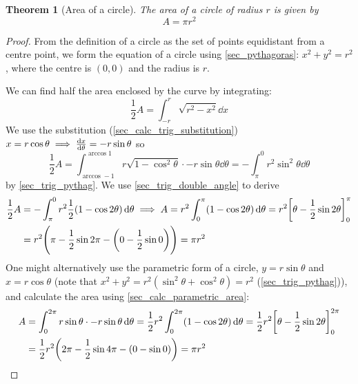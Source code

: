 \documentclass[fleqn,a4paper,11pt]{article}
\newtheorem{theorem}{Theorem}[section]
\begin{document}
    \begin{theorem}[Area of a circle]
    The area of a circle of radius \(r\) is given by
    \begin{equation*}
    A = \pi r^2
    \end{equation*}
    \end{theorem}
    \begin{proof}
    From the definition of a circle as the set of points equidistant from a
    centre point, we form the equation of a circle using \ref{sec_pythagoras}:
    \(x^2 + y^2 = r^2\), where the centre is \((0, 0)\) and the radius is \(r\).

    We can find half the area enclosed by the curve by integrating:
    \begin{equation*}
    \frac 12 A = \int_{-r}^r \sqrt{r^2 - x^2} \dd{x}
    \end{equation*}
    We use the substitution (\ref{sec_calc_trig_substitution})
    \(x = r \cos \theta \implies \dv{x}{\theta} = -r \sin \theta\) so
    \begin{equation*}
    \frac 12 A = \int_{\arccos -1}^{\arccos 1}
        r\sqrt{1 - \cos^2 \theta} \cdot -r \sin \theta \dd{\theta}
      = -\int_\pi^0 r^2 \sin^2 \theta \dd{\theta}
    \end{equation*}
    by \ref{sec_trig_pythag}. We use \ref{sec_trig_double_angle} to derive
    \begin{align*}
    \frac 12 A &= -\int_\pi^0
        r^2 \frac 12 (1 - \cos 2 \theta) \dd{\theta} \implies
     A = r^2 \int_0^\pi (1 - \cos 2 \theta) \dd{\theta} =
     r^2\bqty{\theta - \frac 12 \sin 2 \theta}_0^\pi \\
     &= r^2 \pqty{\pi - \frac 12 \sin 2 \pi -
                   \pqty{0 - \frac 12 \sin 0}} = \pi r^2
    \end{align*}
    One might alternatively use the parametric form of a circle,
    \(y = r \sin \theta\) and \(x = r \cos \theta\)
    (note that \(x^2 + y^2 = r^2(\sin^2 \theta + \cos^2 \theta) = r^2\)
    (\ref{sec_trig_pythag})), and calculate the area using
    \ref{sec_calc_parametric_area}:
    \begin{align*}
    A &= \int_0^{2\pi}
        r \sin \theta \cdot -r \sin \theta \dd{\theta} =
     \frac 12 r^2 \int_0^{2\pi} (1 - \cos 2 \theta) \dd{\theta} =
     \frac 12 r^2 \bqty{\theta - \frac 12 \sin 2 \theta}_0^{2\pi} \\
     &= \frac 12 r^2 \pqty{2\pi - \frac 12 \sin 4 \pi -
                      \pqty{0 - \sin 0}} = \pi r^2
    \end{align*}
    \end{proof}
\end{document}
